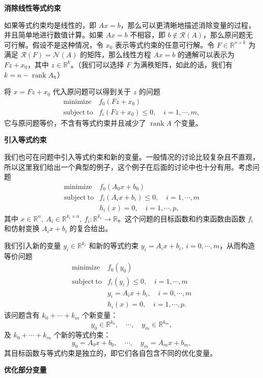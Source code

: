 \documentclass[UTF8,12pt,a4paper,fontset=fandol]{ctexart}
\begin{document}
\noindent\textbf{消除线性等式约束}

如果等式约束均是线性的，即 $Ax=b$，那么可以更清晰地描述消除变量的过程，并且简单地进行数值计算。如果 $Ax=b$ 不相容，即 $b\notin\mathcal{R}(A)$，那么原问题无可行解。假设不是这种情况，令 $x_0$ 表示等式约束的任意可行解。令 $F\in\mathbb{R}^{n\times k}$ 为满足 $\mathcal{R}(F)=\mathcal{N}(A)$ 的矩阵，那么线性方程 $Ax=b$ 的通解可以表示为 $Fz+x_0$，其中 $z\in\mathbb{R}^k$。（我们可以选择 $F$ 为满秩矩阵，如此的话，我们有 $k=n-\operatorname{rank} A$。）

将 $x=Fz+x_0$ 代入原问题可以得到关于 $z$ 的问题
\[
\begin{array}{ll}
\mathop{\mathrm{minimize}} & f_0(Fz+x_0)\\
\mathrm{subject\ to} & f_i(Fz+x_0)\leq 0,\quad i=1,\cdots,m,
\end{array}
\]
它与原问题等价，不含有等式约束并且减少了 $\operatorname{rank}A$ 个变量。

\noindent\textbf{引入等式约束}

我们也可在问题中引入等式约束和新的变量。一般情况的讨论比较复杂且不直观，所以这里我们给出一个典型的例子，这个例子在后面的讨论中也十分有用。考虑问题
\[
\begin{array}{ll}
\mathop{\mathrm{minimize}} & f_0(A_0x+b_0)\\
\mathrm{subject\ to} & f_i(A_ix+b_i)\leq 0,\quad i=1,\cdots,m\\
& h_i(x)=0,\quad i=1,\cdots,p,
\end{array}
\]
其中 $x\in\mathbb{R}^n,\ A_i\in\mathbb{R}^{k_i\times n},\ f_i:\mathbb{R}^{k_i}\to\mathbb{R}$。这个问题的目标函数和约束函数由函数 $f_i$ 和仿射变换 $A_ix+b_i$ 的复合给出。

我们引入新的变量 $y_i\in\mathbb{R}^{k_i}$ 和新的等式约束 $y_i=A_ix+b_i,\ i=0,\cdots,m$，从而构造等价问题
\[
\begin{array}{ll}
\mathop{\mathrm{minimize}} & f_0(y_0)\\
\mathrm{subject\ to} & f_i(y_i)\leq 0,\quad i=1,\cdots,m\\
& y_i=A_ix+b_i,\quad i=0,\cdots,m\\
& h_i(x)=0,\quad i=1,\cdots,p.
\end{array}
\]
该问题含有 $k_0+\cdots+k_m$ 个新变量：
\[
y_0\in\mathbb{R}^{k_0},\quad \cdots,\quad y_m\in\mathbb{R}^{k_m},
\]
及 $k_0+\cdots+k_m$ 个新的等式约束：
\[
y_0=A_0x+b_0,\quad \cdots,\quad y_m=A_mx+b_m,
\]
其目标函数与等式约束是独立的，即它们各自包含不同的优化变量。

\noindent\textbf{优化部分变量}
\end{document}
